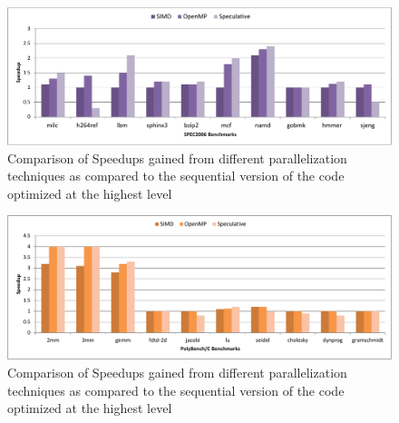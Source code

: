 \documentclass[10pt]{report}          %
\begin{document}
\begin{figure}
\centering
\includegraphics[scale=0.56]{./pdf/spec2006_O5.pdf}
\caption{Comparison of Speedups gained from different parallelization techniques as compared to the sequential version of the code optimized at the highest level }
\label{fig:speedup_O5}
\end{figure}

\begin{figure}
\centering
\includegraphics[scale=0.56]{./pdf/poly_O5.pdf}
\caption{Comparison of Speedups gained from different parallelization techniques as compared to the sequential version of the code optimized at the highest level }
\label{fig:poly_O5}
\end{figure}
\end{document}
